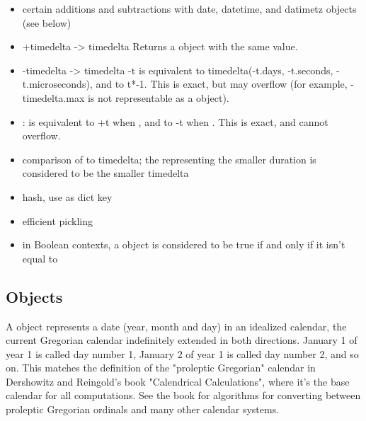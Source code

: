 \begin{itemize}
  \item
    certain additions and subtractions with date, datetime, and datimetz
    objects (see below)

  \item
    +timedelta -> timedelta
    Returns a  object with the same value.

  \item
    -timedelta -> timedelta
    -t is equivalent to timedelta(-t.days, -t.seconds, -t.microseconds),
    and to t*-1.  This is exact, but may overflow (for example,
    -timedelta.max is not representable as a  object).

  \item
    :
     is equivalent to +t when , and to -t when
    .  This is exact, and cannot overflow.

  \item
    comparison of  to timedelta; the  representing
    the smaller duration is considered to be the smaller timedelta

  \item
    hash, use as dict key

  \item
    efficient pickling

  \item
    in Boolean contexts, a  object is considered to be true
    if and only if it isn't equal to 
\end{itemize}


\subsection{ Objects \label{datetime-date}}

A  object represents a date (year, month and day) in an idealized
calendar, the current Gregorian calendar indefinitely extended in both
directions.  January 1 of year 1 is called day number 1, January 2 of year
1 is called day number 2, and so on.  This matches the definition of the
"proleptic Gregorian" calendar in Dershowitz and Reingold's book
"Calendrical Calculations", where it's the base calendar for all
computations.  See the book for algorithms for converting between
proleptic Gregorian ordinals and many other calendar systems.

